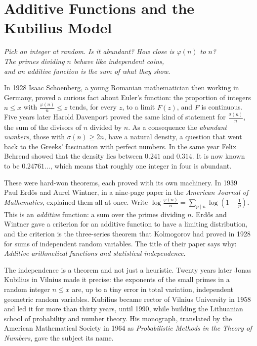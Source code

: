 \chapter{Additive Functions and the Kubilius Model}\label{ch:additive}
\begin{center}\itshape
Pick an integer at random. Is it abundant? How close is $\varphi(n)$ to $n$?\\
The primes dividing $n$ behave like independent coins,\\
and an additive function is the sum of what they show.
\end{center}

In 1928 Isaac Schoenberg, a young Romanian mathematician then working in Germany, proved a curious fact about Euler's function: the proportion of integers $n\le x$ with $\frac{\varphi(n)}n\le z$ tends, for every $z$, to a limit $F(z)$, and $F$ is continuous. Five years later Harold Davenport proved the same kind of statement for $\frac{\sigma(n)}n$, the sum of the divisors of $n$ divided by $n$. As a consequence the \emph{abundant numbers}, those with $\sigma(n)\ge2n$, have a natural density, a question that went back to the Greeks' fascination with perfect numbers. In the same year Felix Behrend showed that the density lies between $0.241$ and $0.314$. It is now known to be $0.24761\ldots$, which means that roughly one integer in four is abundant.

These were hard-won theorems, each proved with its own machinery. In 1939 Paul Erd\H{o}s and Aurel Wintner, in a nine-page paper in the \emph{American Journal of Mathematics}, explained them all at once. Write $\log\frac{\varphi(n)}n=\sum_{p\mid n}\log(1-\frac1p)$. This is an \emph{additive} function: a sum over the primes dividing $n$. Erd\H{o}s and Wintner gave a criterion for an additive function to have a limiting distribution, and the criterion is the three-series theorem that Kolmogorov had proved in 1928 for sums of independent random variables. The title of their paper says why: \emph{Additive arithmetical functions and statistical independence}.

The independence is a theorem and not just a heuristic. Twenty years later Jonas Kubilius in Vilnius made it precise: the exponents of the small primes in a random integer $n\le x$ are, up to a tiny error in total variation, independent geometric random variables. Kubilius became rector of Vilnius University in 1958 and led it for more than thirty years, until 1990, while building the Lithuanian school of probability and number theory. His monograph, translated by the American Mathematical Society in 1964 as \emph{Probabilistic Methods in the Theory of Numbers}, gave the subject its name.

